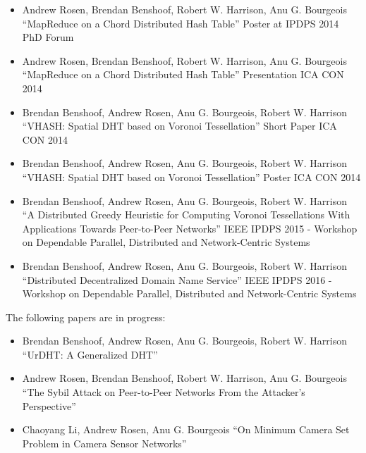 \begin{itemize}
	\item Andrew Rosen, Brendan Benshoof, Robert W. Harrison, Anu G. Bourgeois ``MapReduce on a Chord Distributed Hash Table'' Poster at IPDPS 2014 PhD Forum \cite{chordreduce}
	\item Andrew Rosen, Brendan Benshoof, Robert W. Harrison, Anu G. Bourgeois ``MapReduce on a Chord Distributed Hash Table'' Presentation ICA CON 2014
	\item Brendan Benshoof, Andrew Rosen, Anu G. Bourgeois, Robert W. Harrison ``VHASH: Spatial DHT based on Voronoi Tessellation'' Short Paper ICA CON 2014 \cite{vhash}
	\item Brendan Benshoof, Andrew Rosen, Anu G. Bourgeois, Robert W. Harrison ``VHASH: Spatial DHT based on Voronoi Tessellation'' Poster ICA CON 2014 
	\item Brendan Benshoof, Andrew Rosen, Anu G. Bourgeois, Robert W. Harrison ``A Distributed Greedy Heuristic for Computing Voronoi Tessellations With Applications Towards Peer-to-Peer Networks'' IEEE IPDPS 2015 - Workshop on Dependable Parallel, Distributed and Network-Centric Systems \cite{dgvh}
	\item Brendan Benshoof, Andrew Rosen, Anu G. Bourgeois, Robert W. Harrison
	``Distributed Decentralized Domain Name Service''
	IEEE IPDPS 2016 - Workshop on Dependable Parallel, Distributed and Network-Centric Systems
	
\end{itemize}

The following papers are in progress:

\begin{itemize}
	\item Brendan Benshoof, Andrew Rosen, Anu G. Bourgeois, Robert W. Harrison ``UrDHT: A Generalized DHT''
	\item Andrew Rosen, Brendan Benshoof, Robert W. Harrison, Anu G. Bourgeois ``The Sybil Attack on Peer-to-Peer Networks From the Attacker's Perspective''
	\item Chaoyang Li, Andrew Rosen, Anu G. Bourgeois ``On Minimum Camera Set Problem in Camera Sensor Networks''
\end{itemize}


	


